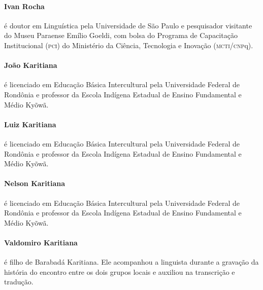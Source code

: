 \paragraph{Ivan Rocha} é doutor em Linguística pela Universidade de São Paulo e
pesquisador visitante do Museu Paraense Emílio Goeldi, com bolsa do
Programa de Capacitação Institucional (\textsc{pci}) do Ministério da Ciência,
Tecnologia e Inovação (\textsc{mcti}/\textsc{cnp}q).

\paragraph{João Karitiana} é licenciado em Educação Básica Intercultural pela
Universidade Federal de Rondônia e professor da Escola Indígena Estadual
de Ensino Fundamental e Médio Kyõwã.

\paragraph{Luiz Karitiana} é licenciado em Educação Básica Intercultural pela
Universidade Federal de Rondônia e professor da Escola Indígena Estadual
de Ensino Fundamental e Médio Kyõwã.

\paragraph{Nelson Karitiana} é licenciado em Educação Básica Intercultural pela
Universidade Federal de Rondônia e professor da Escola Indígena Estadual
de Ensino Fundamental e Médio Kyõwã.

\paragraph{Valdomiro Karitiana} é filho de Barabadá Karitiana. Ele acompanhou a
linguista durante a gravação da história do encontro entre os dois
grupos locais e auxiliou na transcrição e tradução.

\begin{comment}
(Quarta-capa)

Então ele (Moraes) morreu, a doença do branco o matou

Então meu finado pai se juntou

Quando o Moraes morreu, nós ficamos juntos

Nunca mais nos separamos

Assim nós ficamos, assim

Não havia mais homens quando ele morreu

Os homens ficaram com o meu pai

O meu finado pai trouxe todos para cá

Então o meu pai morreu aqui

Então eles não foram mais na aldeia deles

Aqui meu finado pai morreu

Assim o pessoal ficou junto

Não existe mais o que contar, esse é o final
\end{comment}




